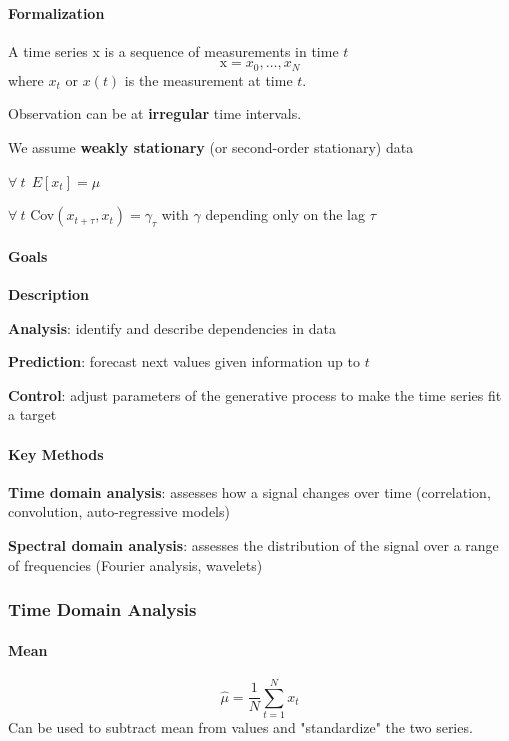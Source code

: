 \documentclass[10pt]{report}
\begin{document}
\paragraph{Formalization} A time series x is a sequence of measurements in time $t$
$$\text{x} = x_0,\ldots,x_N$$
where $x_t$ or $x(t)$ is the measurement at time $t$.
\begin{list}{}{}
	\item Observation can be at \textbf{irregular} time intervals.
	\item We assume \textbf{weakly stationary} (or second-order stationary) data\begin{list}{}{}
		\item $\forall\:t\:\:E[x_t] = \mu$
		\item $\forall\:t$ Cov$(x_{t+\tau},x_t) = \gamma_\tau$ with $\gamma$ depending only on the lag $\tau$
	\end{list}
\end{list}
\paragraph{Goals}\begin{list}{}{}
	\item \textbf{Description}
	\item \textbf{Analysis}: identify and describe dependencies in data
	\item \textbf{Prediction}: forecast next values given information up to $t$
	\item \textbf{Control}: adjust parameters of the generative process to make the time series fit a target
\end{list}
\paragraph{Key Methods}\begin{list}{}{}
	\item \textbf{Time domain analysis}: assesses how a signal changes over time (correlation, convolution, auto-regressive models)
	\item \textbf{Spectral domain analysis}: assesses the distribution of the signal over a range of frequencies (Fourier analysis, wavelets)
\end{list}
\subsubsection{Time Domain Analysis}
\paragraph{Mean} $$\hat\mu=\frac{1}{N}\sum_{t=1}^N x_t$$
Can be used to subtract mean from values and "standardize" the two series.
\end{document}
